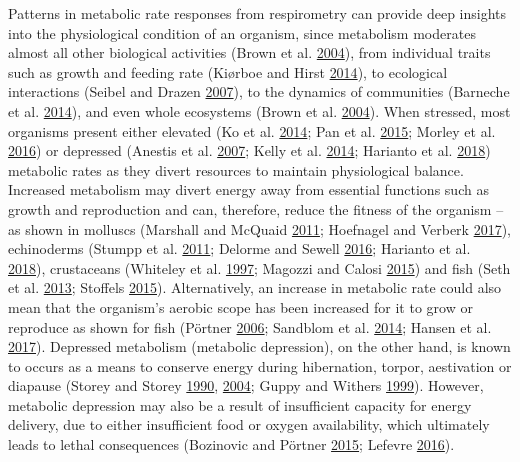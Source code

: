 \documentclass[a4paper,10pt, oneside]{memoir}
\begin{document}
Patterns in metabolic rate responses from respirometry can provide deep insights into the physiological condition of an organism, since metabolism moderates almost all other biological activities (Brown et al. \protect\hyperlink{ref-Brown2004}{2004}), from individual traits such as growth and feeding rate (Kiørboe and Hirst \protect\hyperlink{ref-Kiorboe2014}{2014}), to ecological interactions (Seibel and Drazen \protect\hyperlink{ref-Seibel2007}{2007}), to the dynamics of communities (Barneche et al. \protect\hyperlink{ref-Barneche2014}{2014}), and even whole ecosystems (Brown et al. \protect\hyperlink{ref-Brown2004}{2004}).
When stressed, most organisms present either elevated (Ko et al. \protect\hyperlink{ref-Ko2014}{2014}; Pan et al. \protect\hyperlink{ref-Pan2015}{2015}; Morley et al. \protect\hyperlink{ref-Morley2016}{2016}) or depressed (Anestis et al. \protect\hyperlink{ref-Anestis2007}{2007}; Kelly et al. \protect\hyperlink{ref-Kelly2014}{2014}; Harianto et al. \protect\hyperlink{ref-Harianto2018}{2018}) metabolic rates as they divert resources to maintain physiological balance.
Increased metabolism may divert energy away from essential functions such as growth and reproduction and can, therefore, reduce the fitness of the organism -- as shown in molluscs (Marshall and McQuaid \protect\hyperlink{ref-Marshall2011}{2011}; Hoefnagel and Verberk \protect\hyperlink{ref-Hoefnagel2017}{2017}), echinoderms (Stumpp et al. \protect\hyperlink{ref-Stumpp2011}{2011}; Delorme and Sewell \protect\hyperlink{ref-Delorme2016}{2016}; Harianto et al. \protect\hyperlink{ref-Harianto2018}{2018}), crustaceans (Whiteley et al. \protect\hyperlink{ref-Whiteley1997}{1997}; Magozzi and Calosi \protect\hyperlink{ref-Magozzi2015}{2015}) and fish (Seth et al. \protect\hyperlink{ref-Seth2013}{2013}; Stoffels \protect\hyperlink{ref-Stoffels2015}{2015}).
Alternatively, an increase in metabolic rate could also mean that the organism's aerobic scope has been increased for it to grow or reproduce as shown for fish (Pörtner \protect\hyperlink{ref-Portner2006}{2006}; Sandblom et al. \protect\hyperlink{ref-Sandblom2014}{2014}; Hansen et al. \protect\hyperlink{ref-Hansen2017}{2017}).
Depressed metabolism (metabolic depression), on the other hand, is known to occurs as a means to conserve energy during hibernation, torpor, aestivation or diapause (Storey and Storey \protect\hyperlink{ref-Storey1990}{1990}, \protect\hyperlink{ref-Storey2004}{2004}; Guppy and Withers \protect\hyperlink{ref-Guppy1999}{1999}).
However, metabolic depression may also be a result of insufficient capacity for energy delivery, due to either insufficient food or oxygen availability, which ultimately leads to lethal consequences (Bozinovic and Pörtner \protect\hyperlink{ref-Bozinovic2015}{2015}; Lefevre \protect\hyperlink{ref-Lefevre2016}{2016}).
\end{document}
